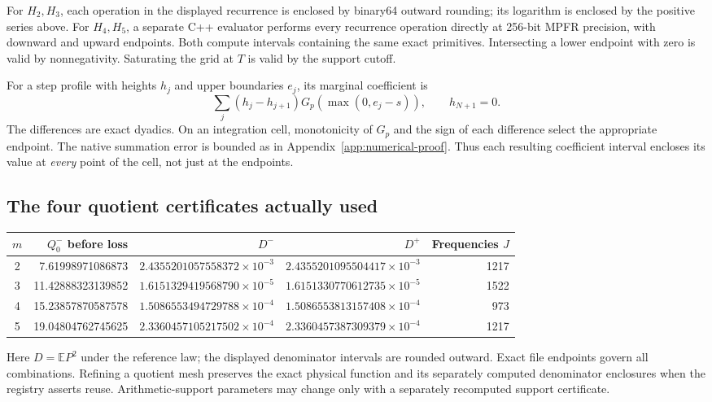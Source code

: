 \documentclass[11pt,a4paper]{article}
\theoremstyle{definition}\newtheorem{definition}[theorem]{Definition}
\theoremstyle{remark}\newtheorem{remark}[theorem]{Remark}
\newcommand{\E}{\mathbb E}\newcommand{\Prob}{\mathbb P}
\newcommand{\smalltable}{\small\setlength{\tabcolsep}{5pt}}
\numberwithin{equation}{section}
\begin{document}
For $H_2,H_3$, each operation in the displayed recurrence is enclosed by binary64 outward rounding; its logarithm is enclosed by the positive series above. For $H_4,H_5$, a separate C++ evaluator performs every recurrence operation directly at 256-bit MPFR precision, with downward and upward endpoints. Both compute intervals containing the same exact primitives. Intersecting a lower endpoint with zero is valid by nonnegativity. Saturating the grid at $T$ is valid by the support cutoff.

For a step profile with heights $h_j$ and upper boundaries $e_j$, its marginal coefficient is
\[
 \sum_j(h_j-h_{j+1})G_p(\max(0,e_j-s)),\qquad h_{N+1}=0.
\]
The differences are exact dyadics. On an integration cell, monotonicity of $G_p$ and the sign of each difference select the appropriate endpoint. The native summation error is bounded as in Appendix~\ref{app:numerical-proof}. Thus each resulting coefficient interval encloses its value at \emph{every} point of the cell, not just at the endpoints.

\subsection{The four quotient certificates actually used}
\begin{center}\smalltable
\begin{tabular}{@{}crrrr@{}}\toprule
$m$&$Q_0^-$ before loss&$D^-$&$D^+$&Frequencies $J$\\\midrule
2&7.61998971086873&$2.4355201057558372\times10^{-3}$&$2.4355201095504417\times10^{-3}$&1217\\
3&11.42888323139852&$1.6151329419568790\times10^{-5}$&$1.6151330770612735\times10^{-5}$&1522\\
4&15.23857870587578&$1.5086553494729788\times10^{-4}$&$1.5086553813157408\times10^{-4}$&973\\
5&19.04804762745625&$2.3360457105217502\times10^{-4}$&$2.3360457387309379\times10^{-4}$&1217\\\bottomrule
\end{tabular}\end{center}
Here $D=\E P^2$ under the reference law; the displayed denominator intervals are rounded outward. Exact file endpoints govern all combinations. Refining a quotient mesh preserves the exact physical function and its separately computed denominator enclosures when the registry asserts reuse. Arithmetic-support parameters may change only with a separately recomputed support certificate.
\end{document}
